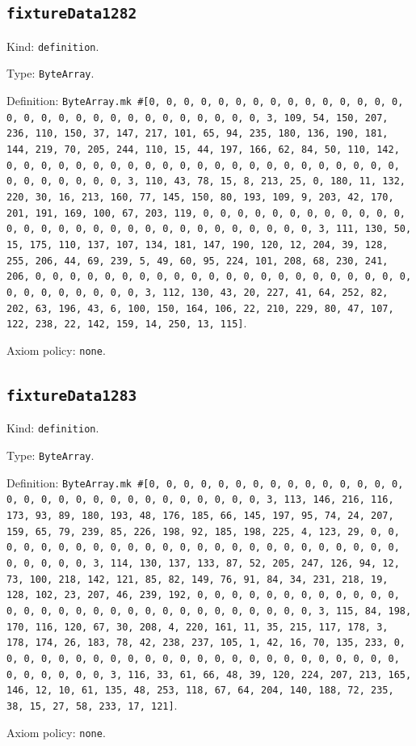 \documentclass[11pt]{article}
\begin{document}
\subsection*{\texttt{fixtureData1282}}
\noindent Kind: \texttt{definition}.\par
\noindent Type: \texttt{ByteArray}.\par
\noindent Definition: \texttt{ByteArray.mk \#[0, 0, 0, 0, 0, 0, 0, 0, 0, 0, 0, 0, 0, 0, 0, 0, 0, 0, 0, 0, 0, 0, 0, 0, 0, 0, 0, 0, 0, 0, 3, 109, 54, 150, 207, 236, 110, 150, 37, 147, 217, 101, 65, 94, 235, 180, 136, 190, 181, 144, 219, 70, 205, 244, 110, 15, 44, 197, 166, 62, 84, 50, 110, 142, 0, 0, 0, 0, 0, 0, 0, 0, 0, 0, 0, 0, 0, 0, 0, 0, 0, 0, 0, 0, 0, 0, 0, 0, 0, 0, 0, 0, 0, 0, 3, 110, 43, 78, 15, 8, 213, 25, 0, 180, 11, 132, 220, 30, 16, 213, 160, 77, 145, 150, 80, 193, 109, 9, 203, 42, 170, 201, 191, 169, 100, 67, 203, 119, 0, 0, 0, 0, 0, 0, 0, 0, 0, 0, 0, 0, 0, 0, 0, 0, 0, 0, 0, 0, 0, 0, 0, 0, 0, 0, 0, 0, 0, 0, 3, 111, 130, 50, 15, 175, 110, 137, 107, 134, 181, 147, 190, 120, 12, 204, 39, 128, 255, 206, 44, 69, 239, 5, 49, 60, 95, 224, 101, 208, 68, 230, 241, 206, 0, 0, 0, 0, 0, 0, 0, 0, 0, 0, 0, 0, 0, 0, 0, 0, 0, 0, 0, 0, 0, 0, 0, 0, 0, 0, 0, 0, 0, 0, 3, 112, 130, 43, 20, 227, 41, 64, 252, 82, 202, 63, 196, 43, 6, 100, 150, 164, 106, 22, 210, 229, 80, 47, 107, 122, 238, 22, 142, 159, 14, 250, 13, 115]}.\par
\noindent Axiom policy: \texttt{none}.\par
\subsection*{\texttt{fixtureData1283}}
\noindent Kind: \texttt{definition}.\par
\noindent Type: \texttt{ByteArray}.\par
\noindent Definition: \texttt{ByteArray.mk \#[0, 0, 0, 0, 0, 0, 0, 0, 0, 0, 0, 0, 0, 0, 0, 0, 0, 0, 0, 0, 0, 0, 0, 0, 0, 0, 0, 0, 0, 0, 3, 113, 146, 216, 116, 173, 93, 89, 180, 193, 48, 176, 185, 66, 145, 197, 95, 74, 24, 207, 159, 65, 79, 239, 85, 226, 198, 92, 185, 198, 225, 4, 123, 29, 0, 0, 0, 0, 0, 0, 0, 0, 0, 0, 0, 0, 0, 0, 0, 0, 0, 0, 0, 0, 0, 0, 0, 0, 0, 0, 0, 0, 0, 0, 3, 114, 130, 137, 133, 87, 52, 205, 247, 126, 94, 12, 73, 100, 218, 142, 121, 85, 82, 149, 76, 91, 84, 34, 231, 218, 19, 128, 102, 23, 207, 46, 239, 192, 0, 0, 0, 0, 0, 0, 0, 0, 0, 0, 0, 0, 0, 0, 0, 0, 0, 0, 0, 0, 0, 0, 0, 0, 0, 0, 0, 0, 0, 0, 3, 115, 84, 198, 170, 116, 120, 67, 30, 208, 4, 220, 161, 11, 35, 215, 117, 178, 3, 178, 174, 26, 183, 78, 42, 238, 237, 105, 1, 42, 16, 70, 135, 233, 0, 0, 0, 0, 0, 0, 0, 0, 0, 0, 0, 0, 0, 0, 0, 0, 0, 0, 0, 0, 0, 0, 0, 0, 0, 0, 0, 0, 0, 0, 3, 116, 33, 61, 66, 48, 39, 120, 224, 207, 213, 165, 146, 12, 10, 61, 135, 48, 253, 118, 67, 64, 204, 140, 188, 72, 235, 38, 15, 27, 58, 233, 17, 121]}.\par
\noindent Axiom policy: \texttt{none}.\par
\end{document}
